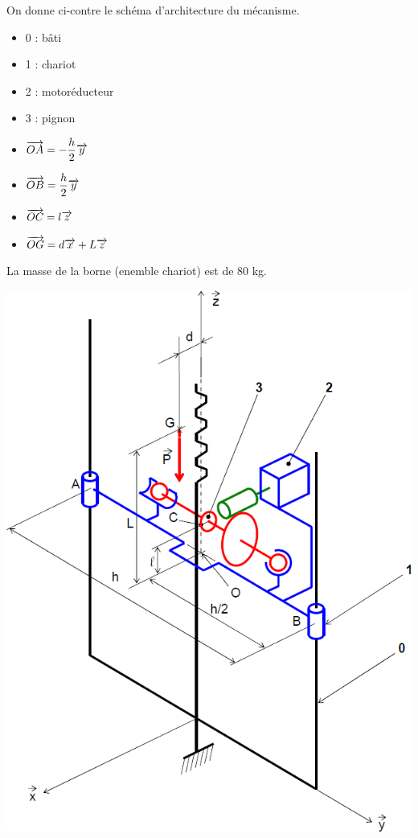 \documentclass[10pt]{article}
\begin{document}
\begin{minipage}[c]{.3\linewidth}
On donne ci-contre le schéma d'architecture du mécanisme.

\vspace{.5cm}

\begin{itemize}
\item 0 : bâti
\item 1 : chariot
\item 2 : motoréducteur
\item 3 : pignon
\end{itemize}

\vspace{.5cm}

\begin{itemize}
\item $\overrightarrow{OA} = - \dfrac{h}{2} \overrightarrow{y}$
\item $\overrightarrow{OB} = \dfrac{h}{2} \overrightarrow{y}$
\item $\overrightarrow{OC} = l \overrightarrow{z}$
\item $\overrightarrow{OG} = d \overrightarrow{x} + L\overrightarrow{z}$
\end{itemize}

\vspace{.5cm}
La masse de la borne (enemble chariot) est de 80 kg.

\end{minipage} \hfill
\begin{minipage}[c]{.6\linewidth}
\begin{center}
\includegraphics[width=.9\textwidth]{images/schema}
\end{center}
\end{minipage} 
\end{document}
